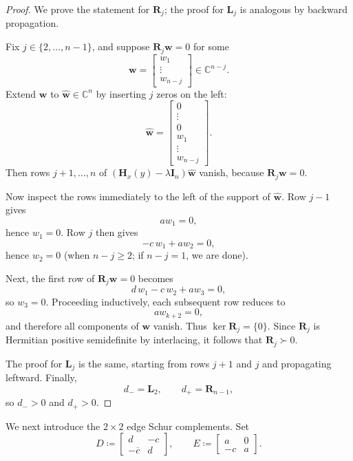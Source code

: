 \documentclass[11pt]{article}
\begin{document}
\begin{proof}
We prove the statement for \(\mathbf R_j\); the proof for \(\mathbf L_j\) is analogous by backward propagation.

Fix \(j\in\{2,\dots,n-1\}\), and suppose \(\mathbf R_j\mathbf w=0\) for some
\[
\mathbf w=
\begin{bmatrix}
w_1\\ \vdots\\ w_{n-j}
\end{bmatrix}\in\mathbb C^{n-j}.
\]
Extend \(\mathbf w\) to \(\widehat{\mathbf w}\in\mathbb C^n\) by inserting \(j\) zeros on the left:
\[
\widehat{\mathbf w}=
\begin{bmatrix}
0\\ \vdots\\ 0\\ w_1\\ \vdots\\ w_{n-j}
\end{bmatrix}.
\]
Then rows \(j+1,\dots,n\) of \((\mathbf H_x(y)-\lambda\mathbf I_n)\widehat{\mathbf w}\) vanish, because
\(\mathbf R_j\mathbf w=0\).

Now inspect the rows immediately to the left of the support of \(\widehat{\mathbf w}\).
Row \(j-1\) gives
\[
a w_1=0,
\]
hence \(w_1=0\). Row \(j\) then gives
\[
-c\,w_1+a w_2=0,
\]
hence \(w_2=0\) (when \(n-j\ge 2\); if \(n-j=1\), we are done).

Next, the first row of \(\mathbf R_j\mathbf w=0\) becomes
\[
d\,w_1-c\,w_2+a w_3=0,
\]
so \(w_3=0\). Proceeding inductively, each subsequent row reduces to
\[
a w_{k+2}=0,
\]
and therefore all components of \(\mathbf w\) vanish. Thus \(\ker \mathbf R_j=\{0\}\). Since \(\mathbf R_j\) is Hermitian positive semidefinite by interlacing, it follows that \(\mathbf R_j\succ 0\).

The proof for \(\mathbf L_j\) is the same, starting from rows \(j+1\) and \(j\) and propagating leftward. Finally,
\[
d_-=\mathbf L_2,
\qquad
d_+=\mathbf R_{n-1},
\]
so \(d_->0\) and \(d_+>0\).
\end{proof}

We next introduce the \(2\times 2\) edge Schur complements. Set
\[
D\coloneqq
\begin{bmatrix}
d & -c\\
-\overline c & d
\end{bmatrix},
\qquad
E\coloneqq
\begin{bmatrix}
a&0\\
-c&a
\end{bmatrix}.
\]
\end{document}
